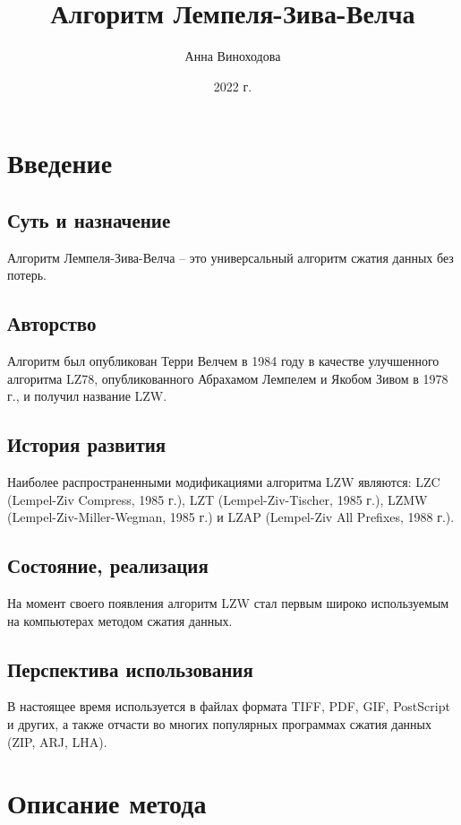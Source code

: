 \documentclass{article}
\title{Алгоритм Лемпеля-Зива-Велча}
\author{Анна Виноходова}
\date{2022 г.}
\begin{document}
\maketitle

\section{Введение}

\subsection{Суть и назначение}

Алгоритм Лемпеля-Зива-Велча – это универсальный алгоритм сжатия данных без потерь.

\subsection{Авторство}

Алгоритм был опубликован Терри Велчем в 1984 году в качестве улучшенного алгоритма LZ78, опубликованного Абрахамом Лемпелем и Якобом Зивом в 1978 г., и получил название LZW.

\subsection{История развития}

Наиболее распространенными модификациями алгоритма LZW являются: LZC (Lempel-Ziv Compress, 1985 г.), LZT (Lempel-Ziv-Tischer, 1985 г.), LZMW (Lempel-Ziv-Miller-Wegman, 1985 г.) и LZAP (Lempel-Ziv All Prefixes, 1988 г.).

\subsection{Состояние, реализация}

На момент своего появления алгоритм LZW стал первым широко используемым на компьютерах методом сжатия данных.

\subsection{Перспектива использования}

В настоящее время используется в файлах формата TIFF, PDF, GIF, PostScript и других, а также отчасти во многих популярных программах сжатия данных (ZIP, ARJ, LHA).

\section{Описание метода}
\end{document}
